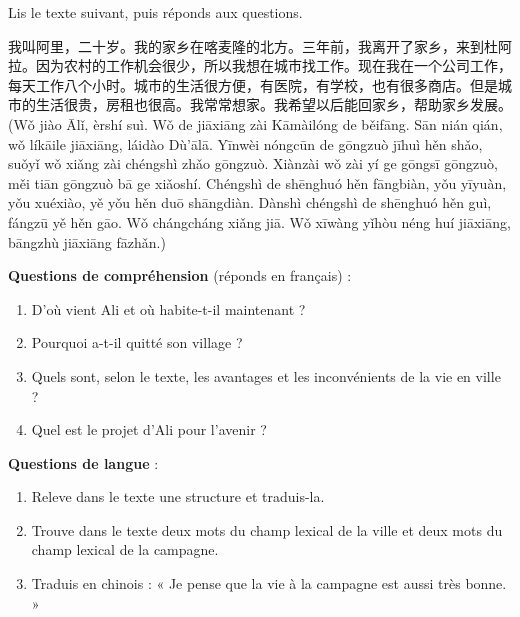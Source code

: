 \documentclass[11pt]{article}
\newcommand{\zh}[1]{\ifmmode\text{#1}\else{#1}\fi}
\begin{document}
\begin{exercice}
Lis le texte suivant, puis réponds aux questions.

\begin{textebox}[从农村到城市]
我叫阿里，二十岁。我的家乡在喀麦隆的北方。三年前，我离开了家乡，来到杜阿拉。因为农村的工作机会很少，所以我想在城市找工作。现在我在一个公司工作，每天工作八个小时。城市的生活很方便，有医院，有学校，也有很多商店。但是城市的生活很贵，房租也很高。我常常想家。我希望以后能回家乡，帮助家乡发展。\\
(Wǒ jiào Ālǐ, èrshí suì. Wǒ de jiāxiāng zài Kāmàilóng de běifāng. Sān nián qián, wǒ líkāile jiāxiāng, láidào Dù'ālā. Yīnwèi nóngcūn de gōngzuò jīhuì hěn shǎo, suǒyǐ wǒ xiǎng zài chéngshì zhǎo gōngzuò. Xiànzài wǒ zài yí ge gōngsī gōngzuò, měi tiān gōngzuò bā ge xiǎoshí. Chéngshì de shēnghuó hěn fāngbiàn, yǒu yīyuàn, yǒu xuéxiào, yě yǒu hěn duō shāngdiàn. Dànshì chéngshì de shēnghuó hěn guì, fángzū yě hěn gāo. Wǒ chángcháng xiǎng jiā. Wǒ xīwàng yǐhòu néng huí jiāxiāng, bāngzhù jiāxiāng fāzhǎn.)
\end{textebox}

\textbf{Questions de compréhension} (réponds en français) :
\begin{enumerate}
\item D'où vient Ali et où habite-t-il maintenant ?
\item Pourquoi a-t-il quitté son village ?
\item Quels sont, selon le texte, les avantages et les inconvénients de la vie en ville ?
\item Quel est le projet d'Ali pour l'avenir ?
\end{enumerate}
\textbf{Questions de langue} :
\begin{enumerate}
\item Releve dans le texte une structure \zh{因为……所以……} et traduis-la.
\item Trouve dans le texte deux mots du champ lexical de la ville et deux mots du champ lexical de la campagne.
\item Traduis en chinois : « Je pense que la vie à la campagne est aussi très bonne. »
\end{enumerate}
\end{exercice}
\end{document}
